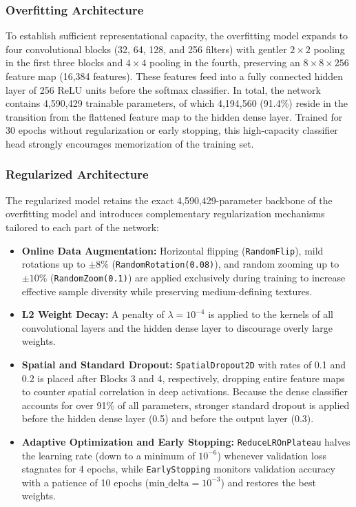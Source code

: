 \documentclass[11pt, a4paper]{article}
\begin{document}
\subsubsection{Overfitting Architecture}
To establish sufficient representational capacity, the overfitting model expands to four convolutional blocks (32, 64, 128, and 256 filters) with gentler $2 \times 2$ pooling in the first three blocks and $4 \times 4$ pooling in the fourth, preserving an $8 \times 8 \times 256$ feature map (16,384 features). These features feed into a fully connected hidden layer of 256 ReLU units before the softmax classifier. In total, the network contains 4,590,429 trainable parameters, of which 4,194,560 (91.4\%) reside in the transition from the flattened feature map to the hidden dense layer. Trained for 30 epochs without regularization or early stopping, this high-capacity classifier head strongly encourages memorization of the training set.

\subsubsection{Regularized Architecture}
The regularized model retains the exact 4,590,429-parameter backbone of the overfitting model and introduces complementary regularization mechanisms tailored to each part of the network:
\begin{itemize}
    \item \textbf{Online Data Augmentation:} Horizontal flipping (\texttt{RandomFlip}), mild rotations up to $\pm 8\%$ (\texttt{RandomRotation(0.08)}), and random zooming up to $\pm 10\%$ (\texttt{RandomZoom(0.1)}) are applied exclusively during training to increase effective sample diversity while preserving medium-defining textures.
    \item \textbf{L2 Weight Decay:} A penalty of $\lambda = 10^{-4}$ is applied to the kernels of all convolutional layers and the hidden dense layer to discourage overly large weights.
    \item \textbf{Spatial and Standard Dropout:} \texttt{SpatialDropout2D} with rates of 0.1 and 0.2 is placed after Blocks 3 and 4, respectively, dropping entire feature maps to counter spatial correlation in deep activations. Because the dense classifier accounts for over 91\% of all parameters, stronger standard dropout is applied before the hidden dense layer (0.5) and before the output layer (0.3).
    \item \textbf{Adaptive Optimization and Early Stopping:} \texttt{ReduceLROnPlateau} halves the learning rate (down to a minimum of $10^{-6}$) whenever validation loss stagnates for 4 epochs, while \texttt{EarlyStopping} monitors validation accuracy with a patience of 10 epochs ($\text{min\_delta} = 10^{-3}$) and restores the best weights.
\end{itemize}
\end{document}
